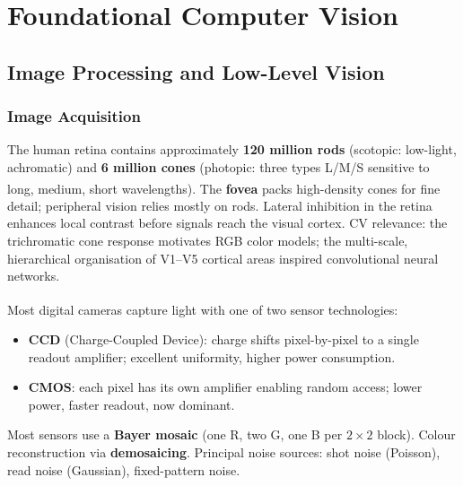 \chapter{Foundational Computer Vision}

\section{Image Processing and Low-Level Vision}

\subsection{Image Acquisition}

\begin{tcbitemize}[ skin=sectionraster ]
    \tcbitem[title={The Human Visual System}, raster multicolumn=3]
    The human retina contains approximately \textbf{120 million rods} (scotopic: low-light, achromatic) and
    \textbf{6 million cones} (photopic: three types L/M/S sensitive to long, medium, short wavelengths)\textsuperscript{\cite[][p.~57]{szeliski2022}}.
    The \textbf{fovea} packs high-density cones for fine detail; peripheral vision relies mostly on rods.
    Lateral inhibition in the retina enhances local contrast before signals reach the visual cortex.
    \tcblower
    CV relevance: the trichromatic cone response motivates RGB color models; the multi-scale,
    hierarchical organisation of V1--V5 cortical areas inspired convolutional neural networks.

    \tcbitem[title={Camera Sensors: CCD and CMOS}, raster multicolumn=3]
    Most digital cameras capture light with one of two sensor technologies\textsuperscript{\cite[][pp.~68--73]{jahneDigitalImageProcessing2005}}:
    \begin{itemize}
        \item \textbf{CCD} (Charge-Coupled Device): charge shifts pixel-by-pixel to a single readout amplifier; excellent uniformity, higher power consumption.
        \item \textbf{CMOS}: each pixel has its own amplifier enabling random access; lower power, faster readout, now dominant.
    \end{itemize}
    Most sensors use a \textbf{Bayer mosaic} (one R, two G, one B per $2{\times}2$ block).
    Colour reconstruction via \textbf{demosaicing}.
    Principal noise sources: shot noise (Poisson), read noise (Gaussian), fixed-pattern noise.
\end{tcbitemize}

